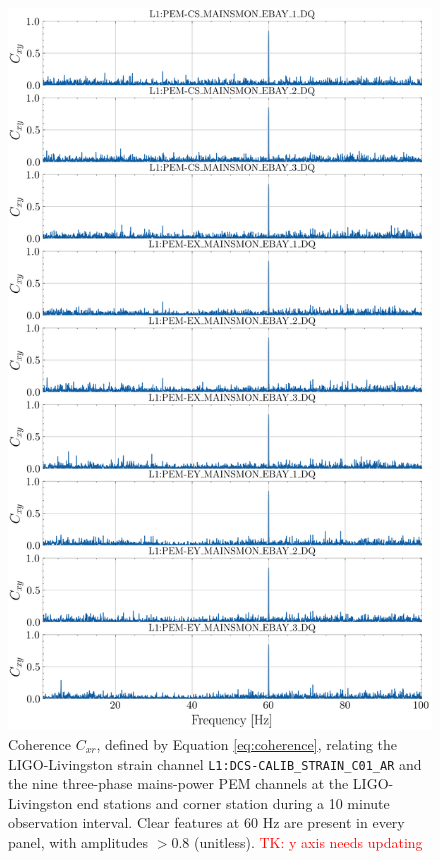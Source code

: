 \documentclass[pra,superscriptaddress,reprint,amsmath,amssymb,nofootinbib]{revtex4-2}
\begin{document}
\begin{figure}
	\begin{center}
		\includegraphics[width=\columnwidth]{images/stacked_coherence_plot}
	\end{center}
	\caption{\label{coherenceplot_1} Coherence $C_{xr}$, defined by Equation \eqref{eq:coherence}, relating the LIGO-Livingston strain channel  \texttt{L1:DCS-CALIB\_STRAIN\_C01\_AR} and the nine three-phase mains-power PEM channels at the LIGO-Livingston end stations and corner station during a 10 minute observation interval. Clear features at 60 Hz are present in every panel, with amplitudes $ > 0.8$ (unitless). \textcolor{red}{TK: y axis needs updating}}
\end{figure}
\end{document}
